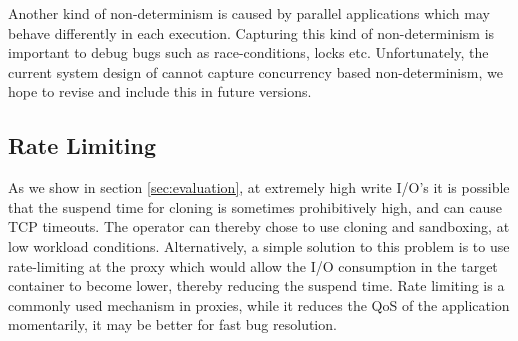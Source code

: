 Another kind of non-determinism is caused by parallel applications which may behave differently in each execution.
Capturing this kind of non-determinism is important to debug bugs such as race-conditions, locks etc.
Unfortunately, the current system design of \parikshan cannot capture concurrency based non-determinism, we hope to revise and include this in future versions.

\iffalse
\subsection{Mid-Tier Servers}
\label{sec:midTier}

\parikshan is not a completely black-box approach, and may require developers to design their applications in a way to support \parikshan, and allow themselves to debug their applications online.
In the paper we have presented a preliminary prototype of our system, applied to some real-world scenarios, to give an understanding of how the approach can be used.
While scaling it out on multi-tier applications, we observed that at times when testing a mid-tier server (which forwards and connects to downstream connections), we need to take care of responses from servers the test-container is connecting to.
A naive and useful strategy is to clone the downstream connections, hence if we are targeting a application server, we need to clone the application server as well as the database server.
Another approach is to use a proxy between the application server(both production and test), and the database server, where the responses of the database to the original production container are cached, and are used to respond to the test-container.
The design of this proxy is similar to our client facing proxy, where requests and responses are being buffered and forwarded. The only difference here is that requests and responses need to be buffered, and checked against incoming requests and then a response needs to be generated. 

\fi

\subsection{Rate Limiting}
\label{sec:ratelimiting}

As we show in section \ref{sec:evaluation}, at extremely high write I/O's it is possible that the suspend time for cloning is sometimes prohibitively high, and can cause TCP timeouts. 
The operator can thereby chose to use cloning and sandboxing, at low workload conditions. 
Alternatively, a simple solution to this problem is to use rate-limiting at the proxy which would allow the I/O consumption in the target container to become lower, thereby reducing the suspend time.
Rate limiting is a commonly used mechanism in proxies, while it reduces the QoS of the application momentarily, it may be better for fast bug resolution.

